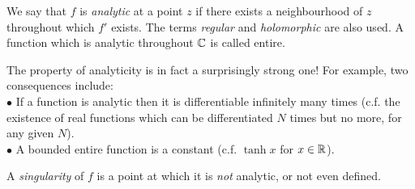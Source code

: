\documentclass[a4paper]{article}
\begin{document}
We say that $f$ is \emph{analytic} at a point $z$ if there exists a neighbourhood of $z$ throughout which $f'$ exists. The terms \emph{regular} and \emph{holomorphic} are also used. A function which is analytic throughout $\mathbb{C}$ is called entire.

The property of analyticity is in fact a surprisingly strong one! For example, two consequences include:\\
$\bullet$ If a function is analytic then it is differentiable infinitely many times (c.f. the existence of real functions which can be differentiated $N$ times but no more, for any given $N$).\\
$\bullet$ A bounded entire function is a constant (c.f. $\tanh x$ for $x \in \mathbb{R}$).

\begin{defi}
A \emph{singularity} of $f$ is a point at which it is \emph{not} analytic, or not even defined.
\end{defi}
\end{document}
